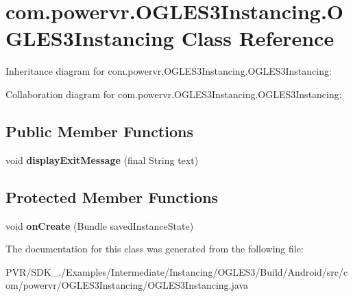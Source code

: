 \hypertarget{classcom_1_1powervr_1_1_o_g_l_e_s3_instancing_1_1_o_g_l_e_s3_instancing}{\section{com.\+powervr.\+O\+G\+L\+E\+S3\+Instancing.\+O\+G\+L\+E\+S3\+Instancing Class Reference}
\label{classcom_1_1powervr_1_1_o_g_l_e_s3_instancing_1_1_o_g_l_e_s3_instancing}
}


Inheritance diagram for com.\+powervr.\+O\+G\+L\+E\+S3\+Instancing.\+O\+G\+L\+E\+S3\+Instancing\+:


Collaboration diagram for com.\+powervr.\+O\+G\+L\+E\+S3\+Instancing.\+O\+G\+L\+E\+S3\+Instancing\+:
\subsection*{Public Member Functions}
\begin{DoxyCompactItemize}
\item 
\hypertarget{classcom_1_1powervr_1_1_o_g_l_e_s3_instancing_1_1_o_g_l_e_s3_instancing_ad59c3a2333b3af7eb76bd7f8606a41bf}{void {\bfseries display\+Exit\+Message} (final String text)}\label{classcom_1_1powervr_1_1_o_g_l_e_s3_instancing_1_1_o_g_l_e_s3_instancing_ad59c3a2333b3af7eb76bd7f8606a41bf}

\end{DoxyCompactItemize}
\subsection*{Protected Member Functions}
\begin{DoxyCompactItemize}
\item 
\hypertarget{classcom_1_1powervr_1_1_o_g_l_e_s3_instancing_1_1_o_g_l_e_s3_instancing_a1be80ac29a03ecddb494f3ea94bc70b1}{void {\bfseries on\+Create} (Bundle saved\+Instance\+State)}\label{classcom_1_1powervr_1_1_o_g_l_e_s3_instancing_1_1_o_g_l_e_s3_instancing_a1be80ac29a03ecddb494f3ea94bc70b1}

\end{DoxyCompactItemize}


The documentation for this class was generated from the following file\+:\begin{DoxyCompactItemize}
\item 
P\+V\+R/\+S\+D\+K\+\_./\+Examples/\+Intermediate/\+Instancing/\+O\+G\+L\+E\+S3/\+Build/\+Android/src/com/powervr/\+O\+G\+L\+E\+S3\+Instancing/O\+G\+L\+E\+S3\+Instancing.\+java\end{DoxyCompactItemize}
